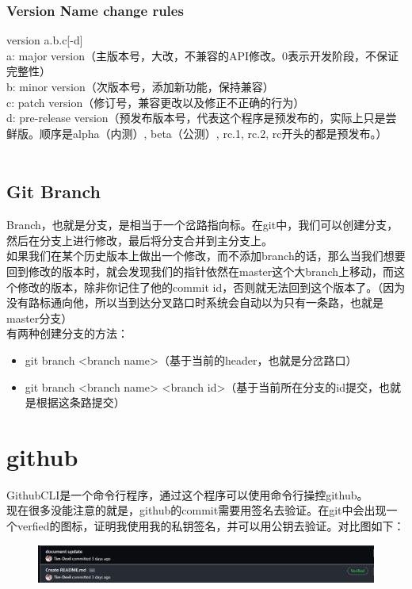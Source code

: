 \documentclass{article}
\begin{document}
\subsubsection{Version Name change rules}
version a.b.c[-d]\\
a: major version（主版本号，大改，不兼容的API修改。0表示开发阶段，不保证完整性）\\
b: minor version（次版本号，添加新功能，保持兼容）\\
c: patch version（修订号，兼容更改以及修正不正确的行为）\\
d: pre-release version（预发布版本号，代表这个程序是预发布的，实际上只是尝鲜版。顺序是alpha（内测）, beta（公测）, rc.1, rc.2, rc开头的都是预发布。）\\
\\
\subsection{Git Branch}
Branch，也就是分支，是相当于一个岔路指向标。在git中，我们可以创建分支，然后在分支上进行修改，最后将分支合并到主分支上。\\
如果我们在某个历史版本上做出一个修改，而不添加branch的话，那么当我们想要回到修改的版本时，就会发现我们的指针依然在master这个大branch上移动，而这个修改的版本，除非你记住了他的commit id，否则就无法回到这个版本了。（因为没有路标通向他，所以当到达分叉路口时系统会自动以为只有一条路，也就是master分支）\\
有两种创建分支的方法：\\
\begin{itemize}
    \item git branch <branch name>（基于当前的header，也就是分岔路口）
    \item git branch <branch name> <branch id>（基于当前所在分支的id提交，也就是根据这条路提交）
\end{itemize}
\section{github}
\noindent
GithubCLI是一个命令行程序，通过这个程序可以使用命令行操控github。\\
现在很多没能注意的就是，github的commit需要用签名去验证。在git中会出现一个verfied的图标，证明我使用我的私钥签名，并可以用公钥去验证。对比图如下：\\
\begin{figure}[h]
    \centering
    \includegraphics[width=\textwidth]{pic1_verfied.png}\\
\end{figure}
\end{document}
